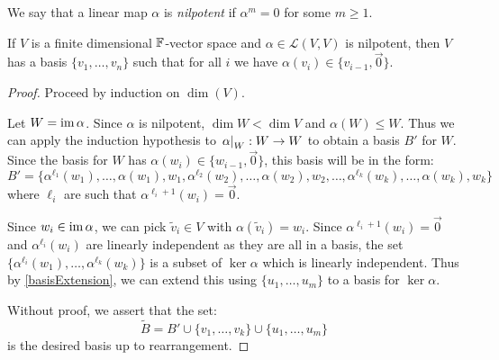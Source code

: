 \documentclass[../main.tex]{subfiles}
\begin{document}
\begin{remark}
  We say that a linear map $\alpha$ is \textit{nilpotent} if $\alpha^{m} = 0$ for some $m \geq 1$.
\end{remark}
\begin{theorem}
  If $V$ is a finite dimensional $\mathbb{F}$-vector space and $\alpha \in \mathcal{L}(V, V)$ is nilpotent, then $V$ has a basis $\{v_1, \ldots, v_n\}$ such that for all $i$ we have $\alpha(v_i) \in \{v_{i - 1}, \vec{0}\}$. \label{nilpot}
\end{theorem}
\begin{proof}
  Proceed by induction on $\dim(V)$.

  Let $W = \operatorname{im} \alpha$.
  Since $\alpha$ is nilpotent, $\dim W < \dim V$ and $\alpha(W) \leq W$.
  Thus we can apply the induction hypothesis to $\left. \alpha \right|_{W}: W \to W$ to obtain a basis $B'$ for $W$.
  Since the basis for $W$ has $\alpha(w_i) \in \{w_{i - 1}, \vec{0}\}$, this basis will be in the form:
  \[
    B' = \{\alpha^{\ell_1}(w_1), \ldots, \alpha(w_1), w_1, \alpha^{\ell_2}(w_2), \ldots, \alpha(w_2), w_2, \ldots, \alpha^{\ell_k}(w_k), \ldots, \alpha(w_k), w_k\}
  \]
  where $\ell_i$ are such that $\alpha^{\ell_i + 1}(w_i) = \vec{0}$.

  Since $w_i \in \operatorname{im} \alpha$, we can pick $\widetilde{v}_i \in V$ with $\alpha(\widetilde{v}_i) = w_i$.
  Since $\alpha^{\ell_i + 1}(w_i) = \vec{0}$ and $\alpha^{\ell_i}(w_i)$ are linearly independent as they are all in a basis, the set $\{\alpha^{\ell_i}(w_1), \ldots, \alpha^{\ell_k}(w_k)\}$ is a subset of $\ker \alpha$ which is linearly independent.
  Thus by \cref{basisExtension}, we can extend this using $\{u_1, \ldots, u_m\}$ to a basis for $\ker \alpha$.

  Without proof, we assert that the set:
  \[
    \widetilde{B} = B' \cup \{v_1, \ldots, v_k\} \cup \{u_1, \ldots, u_m\}
  \]
  is the desired basis up to rearrangement.
\end{proof}
\end{document}
